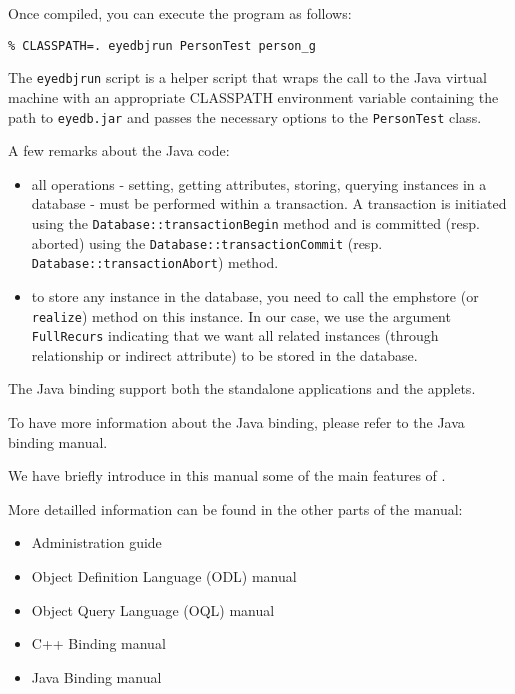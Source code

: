 Once compiled, you can execute the program as follows:
\verbsize \begin{verbatim}
% CLASSPATH=. eyedbjrun PersonTest person_g
\end{verbatim}
\normalsize

The \texttt{eyedbjrun} script is a helper script that wraps the call to the Java 
virtual machine with an appropriate CLASSPATH environment variable containing the path to \texttt{eyedb.jar} and passes the necessary options to the \texttt{PersonTest} class.

A few remarks about the Java code:
\begin{itemize}
\item all operations - setting, getting attributes, storing, querying instances
in a database - must be performed within a transaction.
A transaction is initiated using the \texttt{Database::transactionBegin}
method and is committed (resp. aborted) using the
\texttt{Database::transactionCommit}
(resp. \texttt{Database::transactionAbort}) method.
\item to store any instance in the database, you need to call the 
emph{store} (or \texttt{realize}) method on this instance.
In our case, we use the argument \texttt{FullRecurs} indicating that
we want all related instances (through relationship or indirect
attribute) to be stored in the database.
\end{itemize}

The Java binding support both the standalone applications and the applets.

To have more information about the Java binding, please refer to the
\eyedb Java binding manual.



We have briefly introduce in this manual some of the main features
of \eyedbX.

More detailled information can be found in the other parts of the \eyedb manual:
\begin{itemize}
\item Administration guide
\item Object Definition Language (ODL) manual
\item Object Query Language (OQL) manual
\item C++ Binding manual
\item Java Binding manual
\end{itemize}




